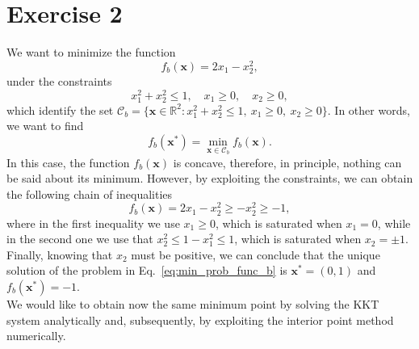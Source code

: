 \documentclass[a4paper,11pt]{article}
\begin{document}
\section*{Exercise 2}
We want to minimize the function
\begin{equation}
	f_{b}(\textbf{x})=2x_{1} - x_{2}^2,
	\label{eq:func_b}
\end{equation}
under the constraints
\begin{equation}
	x_{1}^2 + x_{2}^2 \le 1, \quad x_{1}\ge0, \quad x_{2}\ge0,
	\label{eq:constr_b}
\end{equation}
which identify the set $\mathcal{C}_{b} = \{\textbf{x}\in \mathbb{R}^2 : x_{1}^2 + x_{2}^2 \le 1, \ x_{1}\ge0,\ x_{2}\ge0 \}$. In other words, we want to find
\begin{equation}
	f_b(\textbf{x}^*) = \min_{\textbf{x} \in \mathcal{C}_b} f_b(\textbf{x}).
	\label{eq:min_prob_func_b}
\end{equation}
In this case, the function $f_b(\textbf{x})$ is concave, therefore, in principle, nothing can be said about its minimum. However, by exploiting the constraints, we can obtain the following chain of inequalities
\begin{equation}
	f_b(\textbf{x}) = 2x_{1}-x_{2}^2\ge-x_{2}^2\ge-1,
\end{equation}
where in the first inequality we use $x_{1}\ge0$, which is saturated when $x_{1}=0$, while in the second one we use that $x_{2}^2 \le 1-x_{1}^2\le1$, which is saturated when $x_{2}=\pm1$. Finally, knowing that $x_{2}$ must be positive, we can conclude that the unique solution of the problem in Eq.~\eqref{eq:min_prob_func_b} is $\textbf{x}^*=(0,1)$ and $f_b(\textbf{x}^*)=-1$.\\

\noindent We would like to obtain now the same minimum point by solving the KKT system analytically and, subsequently, by exploiting the interior point method numerically.
\end{document}
